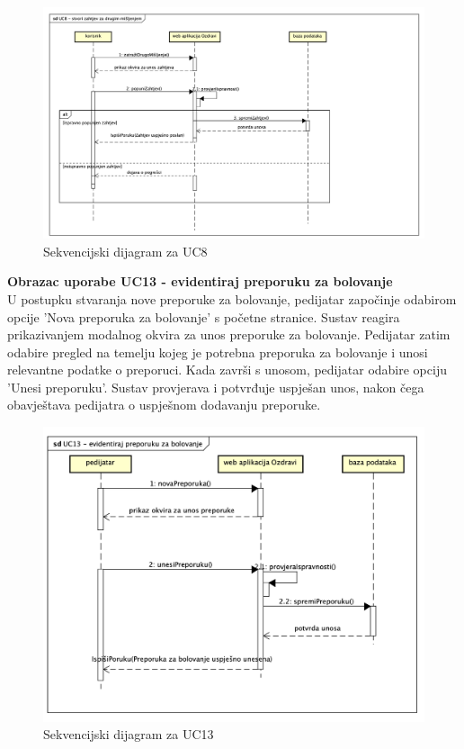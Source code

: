 				\begin{figure}[H]
						\includegraphics[width=\textwidth]{slike/sduc8.png} 
						\caption{Sekvencijski dijagram za UC8}
						\label{fig:promjene2} 
				\end{figure}
				\eject

				\noindent\textbf{Obrazac uporabe UC13 - evidentiraj preporuku za bolovanje}\\
				U postupku stvaranja nove preporuke za bolovanje, pedijatar započinje odabirom opcije 
				'Nova preporuka za bolovanje' s početne stranice. Sustav reagira prikazivanjem modalnog 
				okvira za unos preporuke za bolovanje. Pedijatar zatim odabire pregled na temelju kojeg 
				je potrebna preporuka za bolovanje i unosi relevantne podatke o preporuci. Kada završi 
				s unosom, pedijatar odabire opciju 'Unesi preporuku'. Sustav provjerava i potvrđuje 
				uspješan unos, nakon čega obavještava pedijatra o uspješnom dodavanju preporuke. \\

				\begin{figure}[H]
						\includegraphics[width=\textwidth]{slike/sduc13.png} 
						\caption{Sekvencijski dijagram za UC13}
						\label{fig:promjene2} 
				\end{figure}
				\eject
				
